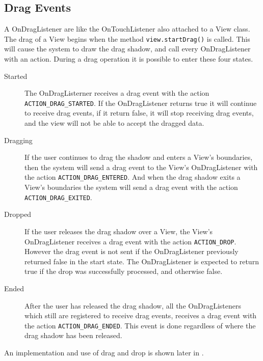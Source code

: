 \subsection*{Drag Events}
A OnDragListener are like the OnTouchListener also attached to a View class. The drag of a View begins when the method \lstinline|view.startDrag()| is called. This will cause the system to draw the drag shadow, and call every OnDragListener with an action. During a drag operation it is possible to enter these four states.
\begin{description}
\item[Started] The OnDragListerner receives a drag event with the action \lstinline|ACTION_DRAG_STARTED|. If the OnDragListener returns true it will continue to receive drag events, if it return false, it will stop receiving drag events, and the view will not be able to accept the dragged data.

\item[Dragging] If the user continues to drag the shadow and enters a View's boundaries, then the system will send a drag event to the View's OnDragListener with the action \lstinline|ACTION_DRAG_ENTERED|. And when the drag shadow exits a View's boundaries the system will send a drag event with the action \lstinline|ACTION_DRAG_EXITED|.

\item[Dropped] If the user releases the drag shadow over a View, the View's OnDragListener receives a drag event with the action \lstinline|ACTION_DROP|. However the drag event is not sent if the OnDragListener previously returned false in the start state. The OnDragListener is expected to return true if the drop was successfully processed, and otherwise false.

\item[Ended] After the user has released the drag shadow, all the OnDragListeners which still are registered to receive drag events,  receives a drag event with the action \lstinline|ACTION_DRAG_ENDED|. This event is done regardless of where the drag shadow has been released.
\end{description}
An implementation and use of drag and drop is shown later in .

